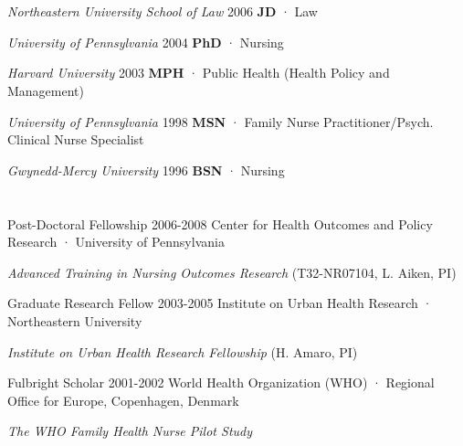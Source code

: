\documentclass[10pt,]{article}
\begin{document}
\section{\Large {}}
{\textit {Northeastern University School of Law} \hfill 2006 \newline
\hspace*{0.5cm} {\textbf {JD}} · Law

{\textit {University of Pennsylvania} \hfill 2004 \newline
\hspace*{0.5cm} {\textbf {PhD}} · Nursing 

{\textit {Harvard University}  \hfill	2003 \newline
\hspace*{0.5cm} {\textbf {MPH}} · Public Health (Health Policy and Management)
	
{\textit {University of Pennsylvania} \hfill 1998 \newline
\hspace*{0.5cm} {\textbf {MSN}} · Family Nurse Practitioner/Psych. Clinical Nurse Specialist

{\textit {Gwynedd-Mercy University} \hfill	1996 \newline
\hspace*{0.5cm} {\textbf {BSN}} · Nursing \newline

\section{\Large {}}

Post-Doctoral Fellowship \hfill 2006-2008 \newline
Center for Health Outcomes and Policy Research · University of Pennsylvania  \newline
\hspace*{0.5cm} {\textit {Advanced Training in Nursing Outcomes Research} (T32-NR07104, L. Aiken, PI)
 
Graduate Research Fellow \hfill 2003-2005 \newline
Institute on Urban Health Research · Northeastern University  \newline
\hspace*{0.5cm} {\textit {Institute on Urban Health Research Fellowship} (H. Amaro, PI)

Fulbright Scholar \hfill 2001-2002 \newline
World Health Organization (WHO) · Regional Office for Europe, Copenhagen, Denmark  \newline
\hspace*{0.5cm} {\textit {The WHO Family Health Nurse Pilot Study}

}}}}}}}}
\end{document}
